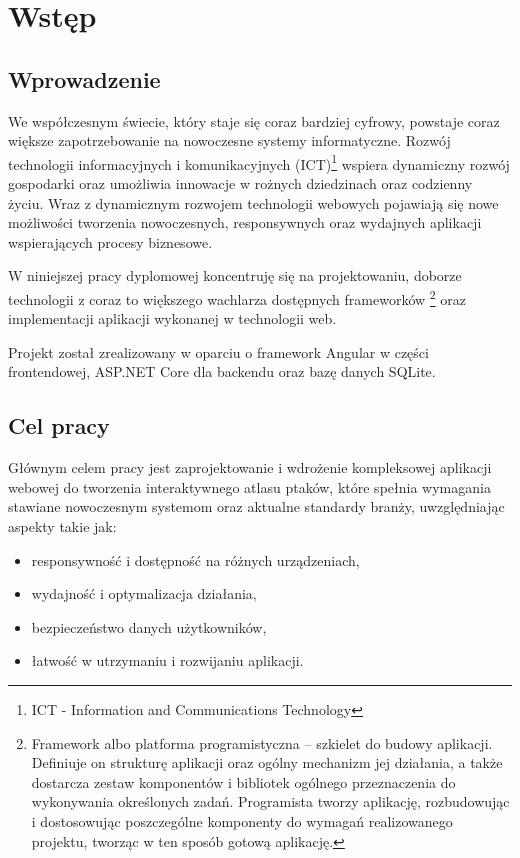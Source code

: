 %


\chapter*{Wstęp}

\section*{Wprowadzenie}

We współczesnym świecie, który staje się coraz bardziej cyfrowy, powstaje coraz większe zapotrzebowanie na nowoczesne systemy informatyczne.
Rozwój technologii informacyjnych i komunikacyjnych (ICT)\footnote{ICT - Information and Communications Technology} wspiera dynamiczny rozwój gospodarki oraz umożliwia innowacje w rożnych dziedzinach oraz codzienny życiu.
Wraz z dynamicznym rozwojem technologii webowych pojawiają się nowe możliwości tworzenia nowoczesnych, responsywnych oraz wydajnych aplikacji wspierających procesy biznesowe.

W niniejszej pracy dyplomowej koncentruję się na projektowaniu, doborze technologii z coraz to większego wachlarza dostępnych frameworków \footnote{Framework albo platforma programistyczna – szkielet do budowy aplikacji. Definiuje on strukturę aplikacji oraz ogólny mechanizm jej działania, a także dostarcza zestaw komponentów i bibliotek ogólnego przeznaczenia do wykonywania określonych zadań. Programista tworzy aplikację, rozbudowując i dostosowując poszczególne komponenty do wymagań realizowanego projektu, tworząc w ten sposób gotową aplikację. } oraz implementacji aplikacji wykonanej w technologii web.

Projekt został zrealizowany w oparciu o framework Angular w części frontendowej, ASP.NET Core dla backendu oraz bazę danych SQLite.

\section*{Cel pracy}

Głównym celem pracy jest zaprojektowanie i wdrożenie kompleksowej aplikacji webowej do tworzenia interaktywnego atlasu ptaków, które spełnia wymagania stawiane nowoczesnym systemom oraz aktualne standardy branży, uwzględniając aspekty takie jak:
\begin{itemize}
    \item responsywność i dostępność na różnych urządzeniach,
    \item wydajność i optymalizacja działania,
    \item bezpieczeństwo danych użytkowników,
    \item łatwość w utrzymaniu i rozwijaniu aplikacji.
\end{itemize}

